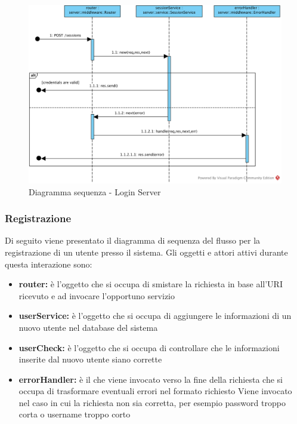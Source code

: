 \documentclass[12pt,a4paper]{article}
\begin{document}
\begin{center}
	\begin{figure}[H]
		\centering \includegraphics[max width=\myheight, angle=90]{../img/diagrammiSequenza/loginServer.png}
		\caption{Diagramma sequenza - Login Server}
	\end{figure}
\end{center}

\newpage
\subsubsection{Registrazione}
Di seguito viene presentato il diagramma di sequenza del flusso per la registrazione di un utente presso il sistema. Gli oggetti e attori attivi durante questa interazione sono:

\begin{itemize}
	\item \textbf{router:} è l'oggetto che si occupa di smistare la richiesta in base all’URI ricevuto e ad invocare l’opportuno servizio	
	\item \textbf{userService:}  è l'oggetto che si occupa di aggiungere le informazioni di un nuovo utente nel database del sistema
	\item \textbf{userCheck:} è l'oggetto che si occupa di controllare che le informazioni inserite dal nuovo utente siano corrette
	\item \textbf{errorHandler:} è il  che viene invocato verso la fine della richiesta che si occupa di trasformare eventuali errori nel formato  richiesto Viene invocato nel caso in cui la richiesta non sia corretta, per esempio password troppo corta o username troppo corto
\end{itemize}
\end{document}
